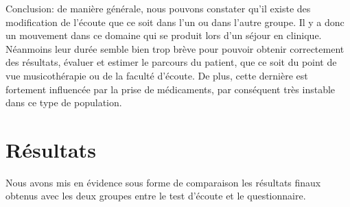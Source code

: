 Conclusion: de manière générale, nous pouvons constater qu'il existe des modification de l'écoute que 
ce soit dans l'un ou dans l'autre groupe. Il y a donc un mouvement dans ce domaine qui se produit lors 
d'un séjour en 
clinique. Néanmoins leur durée semble bien trop brève pour pouvoir obtenir correctement des résultats, 
évaluer et estimer le 
parcours du patient, que ce soit du point de vue musicothérapie ou de la faculté d'écoute. De plus, cette 
dernière  est fortement influencée par la prise de médicaments,  
par conséquent très instable dans ce type de population.
 	
 	
 	
 
%                                 
                                 
  
  
   \chapter{Résultats}
   Nous avons mis en évidence sous forme de comparaison les résultats finaux obtenus avec les deux 
   groupes entre le  test d'écoute et 
   le  questionnaire.
 
   
   
